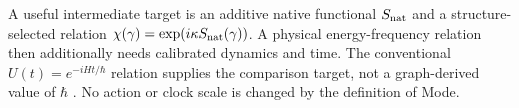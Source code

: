 A useful intermediate target is an additive native functional $S_{\rm nat}$ and a structure-selected relation $\chi(\gamma)=\exp(i\kappa S_{\rm nat}(\gamma))$. A physical energy-frequency relation then additionally needs calibrated dynamics and time. The conventional $U(t)=e^{-iHt/\hbar}$ relation supplies the comparison target, not a graph-derived value of $\hbar$ \citep{bipm}. No action or clock scale is changed by the definition of Mode.
